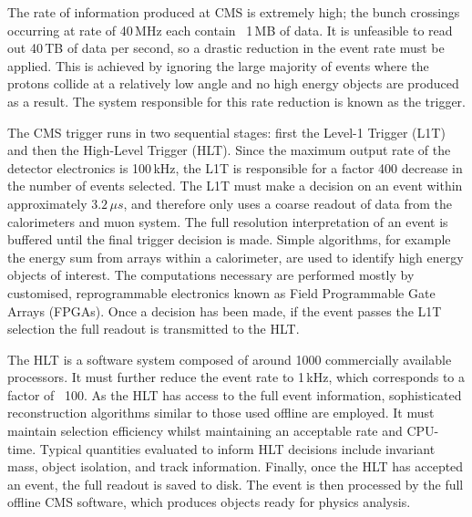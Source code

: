 The rate of information produced at CMS is extremely high; the bunch crossings occurring at rate of 40\,MHz each contain ~1\,MB of data.
It is unfeasible to read out 40\,TB of data per second, so a drastic reduction in the event rate must be applied.
This is achieved by ignoring the large majority of events where the protons collide at a relatively low angle and no high energy objects are produced as a result.
The system responsible for this rate reduction is known as the trigger.

The CMS trigger runs in two sequential stages: first the Level-1 Trigger (L1T) and then the High-Level Trigger (HLT).
Since the maximum output rate of the detector electronics is 100\,kHz, the L1T is responsible for a factor 400 decrease in the number of events selected.
The L1T must make a decision on an event within approximately $3.2\,\mu s$, and therefore only uses a coarse readout of data from the calorimeters and muon system.
The full resolution interpretation of an event is buffered until the final trigger decision is made. %
Simple algorithms, for example the energy sum from arrays within a calorimeter, are used to identify high energy objects of interest.
The computations necessary are performed mostly by customised, reprogrammable electronics known as Field Programmable Gate Arrays (FPGAs).
Once a decision has been made, if the event passes the L1T selection the full readout is transmitted to the HLT.

The HLT is a software system composed of around 1000 commercially available processors.
It must further reduce the event rate to 1\,kHz, which corresponds to a factor of ~100.
As the HLT has access to the full event information, sophisticated reconstruction algorithms similar to those used offline are employed. 
It must maintain selection efficiency whilst maintaining an acceptable rate and CPU-time. 
Typical quantities evaluated to inform HLT decisions include invariant mass, object isolation, and track information.
Finally, once the HLT has accepted an event, the full readout is saved to disk.
The event is then processed by the full offline CMS software, which produces objects ready for physics analysis.
